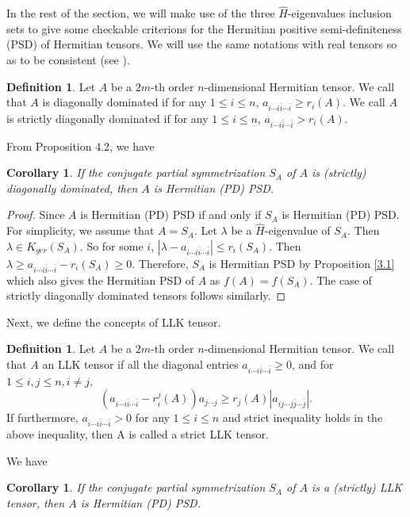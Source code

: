 \documentclass[10pt,reqno]{amsart}
\newtheorem{cor}[thm]{Corollary}
\theoremstyle{definition}
\newtheorem{defn}[thm]{Definition}
\begin{document}
	
In the rest of the section, we will make use of the three $\hat{H}$-eigenvalues inclusion sets to give some checkable criterions for the Hermitian positive semi-definiteness (PSD) of Hermitian tensors. We will use the same notations with real tensors so as to be consistent (see \cite{QL}). 
\begin{defn}
	Let $A$ be a $2m$-th order $n$-dimensional Hermitian tensor. We call that $A$ is diagonally dominated if for any $1\leq i\leq n$, $a_{i\cdots i\bar{i}\cdots\bar{i}}\geq r_i(A).$ We call $A$ is strictly diagonally dominated if for any $1\leq i\leq n$, $a_{i\cdots i\bar{i}\cdots\bar{i}}> r_i(A).$ \end{defn}
	From Proposition 4.2, we have 
	\begin{cor} \label{4.5}
	If the conjugate partial symmetrization $S_A$ of $A$ is (strictly) diagonally dominated, then $A$ is Hermitian (PD) PSD.
	\end{cor}
	\begin{proof}
	Since $A$ is Hermitian (PD) PSD if and only if $S_A$ is Hermitian (PD) PSD. For simplicity, we assume that $A=S_A$. Let $\lambda$ be a $\hat{H}$-eigenvalue of $S_A$. Then $\lambda\in K_{ger}(S_A)$. So for some $i$, $|\lambda-a_{i\cdots i\bar{i}\cdots\bar{i}}|\leq r_i(S_A)$. Then $\lambda\geq a_{i\cdots i\bar{i}\cdots\bar{i}}-r_i(S_A)\geq 0$. Therefore, $S_A$ is Hermitian PSD by Proposition \ref{3.1} which also gives the Hermitian PSD of $A$ as $f(A)=f(S_A)$. The case of strictly diagonally dominated tensors follows similarly. 
	\end{proof}
	Next, we define the concepts of LLK tensor. 
\begin{defn}
	Let $A$ be a $2m$-th order $n$-dimensional Hermitian tensor. We call that $A$ an LLK tensor if all the diagonal entries $a_{i\cdots i\bar{i}\cdots\bar{i}}\geq0$, and for $1\leq i,j\leq n, i\neq j,$
	$$(a_{i\cdots i\bar{i}\cdots\bar{i}}-r_{i}^{j}(A))a_{j\cdots j}\geq r_{j}(A)|a_{ij\cdots j\bar{j}\cdots \bar{j}}|.$$
If furthermore, $a_{i\cdots i\bar{i}\cdots\bar{i}}>0$ for any $1\leq i\leq n$ and strict inequality holds in the above inequality, then A is called a strict LLK tensor.
\end{defn}
We have 
	\begin{cor}\label{4.6}
	If the conjugate partial symmetrization $S_A$ of $A$ is a (strictly) LLK tensor, then $A$ is Hermitian (PD) PSD.
	\end{cor}
\end{document}
